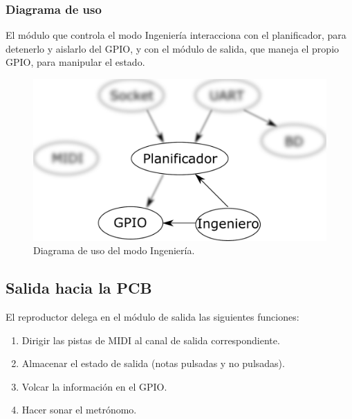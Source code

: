 \subsubsection{Diagrama de uso}

El módulo que controla el modo Ingeniería interacciona con el planificador, para detenerlo y aislarlo del \acrshort{GPIO}, y con el módulo de salida, que maneja el propio \acrshort{GPIO}, para manipular el estado.

\smallskip

\begin{figure}[H]
	\noindent \begin{centering}
		\includegraphics[width=\linewidth/2]{capitulo4/daemon_engineer}
		\par\end{centering}
	\smallskip
	\caption{\label{fig:daemon_engineer} Diagrama de uso del modo Ingeniería.}
\end{figure} 

\smallskip

\subsection{Salida hacia la PCB}
\label{subsec:output}

El reproductor delega en el módulo de salida las siguientes funciones:

\begin{enumerate}
	\item Dirigir las pistas de \acrshort{MIDI} al canal de salida correspondiente.
	\item Almacenar el estado de salida (notas pulsadas y no pulsadas).
	\item Volcar la información en el \acrshort{GPIO}.
	\item Hacer sonar el metrónomo.
\end{enumerate}

